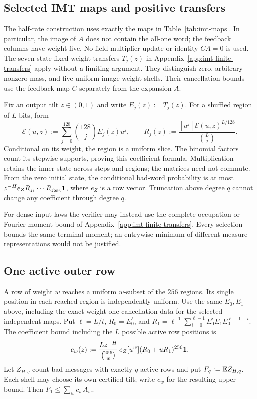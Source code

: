 \subsection{Selected IMT maps and positive transfers}
\label{app:finite-inner-definition}

The half-rate construction uses exactly the maps in Table~\ref{tab:imt-maps}.
In particular, the image of $A$ does not contain the all-one word; the
feedback columns have weight five. No field-multiplier update or identity
$CA=0$ is used. The seven-state fixed-weight transfers
$T_j(z)$ in Appendix~\ref{app:imt-finite-transfers} apply without a limiting
argument. They distinguish zero, arbitrary nonzero mass, and five uniform
image-weight shells. Their cancellation bounds use the feedback map $C$
separately from the expansion $A$.

Fix an output tilt $z\in(0,1)$ and write $E_j(z):=T_j(z)$.
For a shuffled region of $L$ bits, form
\[
 \mathcal E(u,z):=\sum_{j=0}^{128}\binom{128}{j}E_j(z)u^j,\qquad
 R_j(z):=\frac{[u^j]\mathcal E(u,z)^{L/128}}{\binom Lj}.
\]
Conditional on its weight, the region is a uniform slice. The binomial
factors count its stepwise supports, proving this coefficient formula.
Multiplication retains the inner state across steps and regions; the
matrices need not commute. From the zero initial state, the conditional
bad-word probability is at most
$z^{-H}e_ZR_{j_1}\cdots R_{j_{256}}\mathbf 1$, where $e_Z$ is a row vector.
Truncation above degree $q$ cannot change any coefficient through degree $q$.

For dense input laws the verifier may instead use the complete occupation
or Fourier moment bound of Appendix~\ref{app:imt-finite-transfers}.
Every selection bounds the same terminal moment; an entrywise minimum of
different measure representations would not be justified.

\subsection{One active outer row}

A row of weight $w$ reaches a uniform $w$-subset of the $256$ regions.
Its single position in each reached region is independently uniform.
Use the same $E_0,E_1$ above, including the exact weight-one
cancellation data for the selected independent maps.
Put $\ell=L/t$, $R_0=E_0^\ell$, and
$R_1=\ell^{-1}\sum_{i=0}^{\ell-1}E_0^iE_1E_0^{\ell-1-i}$.
The coefficient bound including the $L$ possible active row positions is
\[
 c_w(z):=\frac{Lz^{-H}}{\binom{256}{w}}\,
 e_Z[u^w](R_0+uR_1)^{256}\mathbf 1.
\]
Let $Z_{H,q}$ count bad messages with exactly $q$ active rows and put
$F_q:=\mathbb E Z_{H,q}$. Each shell may choose its own certified tilt;
write $c_w$ for the resulting upper bound. Then $F_1\le\sum_w c_w A_w$.

